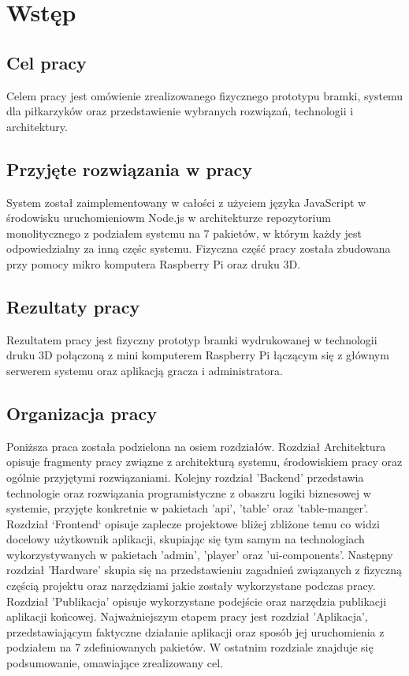 \chapter{Wstęp}
\label{ch:funplenop}

\section{Cel pracy}
Celem pracy jest omówienie zrealizowanego fizycznego prototypu bramki, systemu dla piłkarzyków oraz przedstawienie wybranych rozwiązań, technologii i architektury.

\section{Przyjęte rozwiązania w pracy}
System został zaimplementowany w całości z użyciem języka JavaScript w środowisku uruchomieniowm Node.js w architekturze repozytorium monolitycznego z podziałem systemu na 7 pakietów, w którym każdy jest odpowiedzialny za inną częśc systemu. Fizyczna część pracy została zbudowana przy pomocy mikro komputera Raspberry Pi oraz druku 3D.

\section{Rezultaty pracy}
Rezultatem pracy jest fizyczny prototyp bramki wydrukowanej w technologii druku 3D połączoną z mini komputerem Raspberry Pi łączącym się z głównym serwerem systemu oraz aplikacją gracza i administratora.

\section{Organizacja pracy}
Poniższa praca została podzielona na osiem rozdziałów.
Rozdział Architektura opisuje fragmenty pracy związne z architekturą systemu, środowiskiem pracy oraz ogólnie przyjętymi rozwiązaniami. 
Kolejny rozdział 'Backend' przedstawia technologie oraz rozwiązania programistyczne z obaszru logiki biznesowej w systemie, przyjęte konkretnie w pakietach 'api', 'table' oraz 'table-manger'.
Rozdział `Frontend` opisuje zaplecze projektowe bliżej zbliżone temu co widzi docelowy użytkownik aplikacji, skupiając się tym samym na technologiach wykorzystywanych w pakietach 'admin', 'player' oraz 'ui-components'.
Następny rozdział 'Hardware' skupia się na przedstawieniu zagadnień związanych z fizyczną częścią projektu oraz narzędziami jakie zostały wykorzystane podczas pracy.
Rozdział 'Publikacja' opisuje wykorzystane podejście oraz narzędzia publikacji aplikacji końcowej.
Najważniejszym etapem pracy jest rozdział 'Aplikacja', przedstawiającym faktyczne działanie aplikacji oraz sposób jej uruchomienia z podziałem na 7 zdefiniowanych pakietów.
W ostatnim rozdziale znajduje się podsumowanie, omawiające zrealizowany cel.
